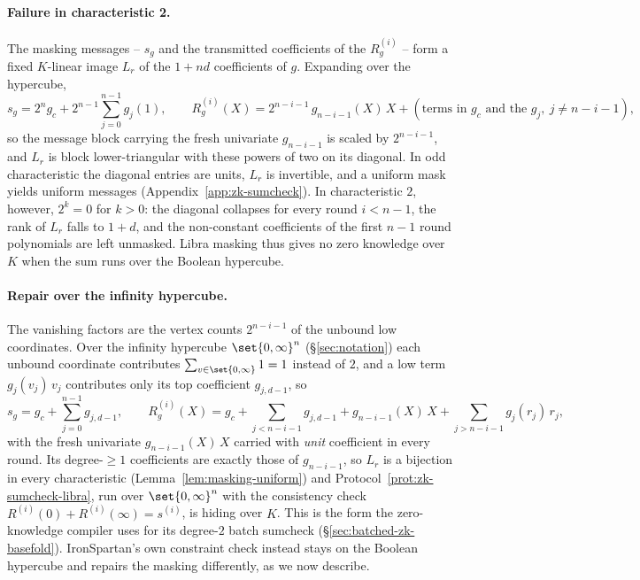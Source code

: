 \documentclass{article}
\theoremstyle{definition}
\begin{document}
\paragraph{Failure in characteristic 2.}
The masking messages -- $s_g$ and the transmitted coefficients of the $R_g^{(i)}$ -- form a fixed $K$-linear image $L_r$ of the $1 + nd$ coefficients of $g$. Expanding over the hypercube,
\[
  s_g = 2^n g_c + 2^{n - 1} \sum_{j = 0}^{n - 1} g_j(1), \qquad R_g^{(i)}(X) = 2^{n - i - 1}\, g_{n - i - 1}(X)\, X + (\text{terms in } g_c \text{ and the } g_j,\ j \neq n - i - 1),
\]
so the message block carrying the fresh univariate $g_{n - i - 1}$ is scaled by $2^{n - i - 1}$, and $L_r$ is block lower-triangular with these powers of two on its diagonal. In odd characteristic the diagonal entries are units, $L_r$ is invertible, and a uniform mask yields uniform messages (Appendix~\ref{app:zk-sumcheck}). In characteristic $2$, however, $2^k = 0$ for $k > 0$: the diagonal collapses for every round $i < n - 1$, the rank of $L_r$ falls to $1 + d$, and the non-constant coefficients of the first $n - 1$ round polynomials are left unmasked. Libra masking thus gives no zero knowledge over $K$ when the sum runs over the Boolean hypercube.

\paragraph{Repair over the infinity hypercube.}
The vanishing factors are the vertex counts $2^{n - i - 1}$ of the unbound low coordinates. Over the infinity hypercube $\set{0, \infty}^n$ (\S\ref{sec:notation}) each unbound coordinate contributes $\sum_{v \in \set{0, \infty}} 1 = 1$ instead of $2$, and a low term $g_j(v_j)\, v_j$ contributes only its top coefficient $g_{j, d - 1}$, so
\[
  s_g = g_c + \sum_{j = 0}^{n - 1} g_{j, d - 1}, \qquad R_g^{(i)}(X) = g_c + \sum_{j < n - i - 1} g_{j, d - 1} + g_{n - i - 1}(X)\, X + \sum_{j > n - i - 1} g_j(r_j)\, r_j,
\]
with the fresh univariate $g_{n - i - 1}(X)\, X$ carried with \emph{unit} coefficient in every round. Its degree-$\ge 1$ coefficients are exactly those of $g_{n - i - 1}$, so $L_r$ is a bijection in every characteristic (Lemma~\ref{lem:masking-uniform}) and Protocol~\ref{prot:zk-sumcheck-libra}, run over $\set{0, \infty}^n$ with the consistency check $R^{(i)}(0) + R^{(i)}(\infty) = s^{(i)}$, is hiding over $K$. This is the form the zero-knowledge compiler uses for its degree-$2$ batch sumcheck (\S\ref{sec:batched-zk-basefold}). IronSpartan's own constraint check instead stays on the Boolean hypercube and repairs the masking differently, as we now describe.
\end{document}
